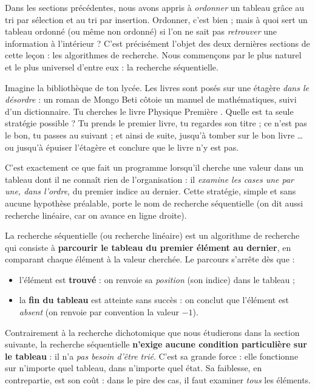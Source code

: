 \documentclass[11pt]{article}
\newcommand{\cle}[1]{{\popxbold\color{popdark}#1}}
\newcounter{popsec}
\newcounter{popsub}
\newcommand{\courssub}[1]{%
  \stepcounter{popsub}%
  \par\vspace{9pt}\noindent{\popxbold\fontsize{11.5}{13}\selectfont\color{popink}{\color{poporange}\thepopsec.\thepopsub}\hspace{6pt}#1}\par\nopagebreak\vspace{4pt}
}
\begin{document}
Dans les sections précédentes, nous avons appris à \emph{ordonner} un tableau grâce au tri par sélection et au tri par insertion. Ordonner, c'est bien ; mais à quoi sert un tableau ordonné (ou même non ordonné) si l'on ne sait pas \emph{retrouver} une information à l'intérieur ? C'est précisément l'objet des deux dernières sections de cette leçon : les \cle{algorithmes de recherche}. Nous commençons par le plus naturel et le plus universel d'entre eux : la \cle{recherche séquentielle}.

\courssub{Situation problème et intuition}

Imagine la bibliothèque de ton lycée. Les livres sont posés sur une étagère \emph{dans le désordre} : un roman de Mongo Beti côtoie un manuel de mathématiques, suivi d'un dictionnaire. Tu cherches le livre \og Physique Première \fg{}. Quelle est ta seule stratégie possible ? Tu prends le premier livre, tu regardes son titre ; ce n'est pas le bon, tu passes au suivant ; et ainsi de suite, jusqu'à tomber sur le bon livre \ldots{} ou jusqu'à épuiser l'étagère et conclure que le livre n'y est pas.

C'est exactement ce que fait un programme lorsqu'il cherche une valeur dans un tableau dont il ne connaît rien de l'organisation : il \emph{examine les cases une par une, dans l'ordre}, du premier indice au dernier. Cette stratégie, simple et sans aucune hypothèse préalable, porte le nom de \cle{recherche séquentielle} (on dit aussi \cle{recherche linéaire}, car on avance en ligne droite).

\begin{definition}
La \cle{recherche séquentielle} (ou recherche linéaire) est un algorithme de recherche qui consiste à \textbf{parcourir le tableau du premier élément au dernier}, en comparant chaque élément à la valeur cherchée. Le parcours s'arrête dès que :
\begin{itemize}
\item l'élément est \textbf{trouvé} : on renvoie sa \emph{position} (son indice) dans le tableau ;
\item la \textbf{fin du tableau} est atteinte sans succès : on conclut que l'élément est \emph{absent} (on renvoie par convention la valeur $-1$).
\end{itemize}
\end{definition}

\begin{propriete}
Contrairement à la recherche dichotomique que nous étudierons dans la section suivante, la recherche séquentielle \textbf{n'exige aucune condition particulière sur le tableau} : il n'a \emph{pas besoin d'être trié}. C'est sa grande force : elle fonctionne sur n'importe quel tableau, dans n'importe quel état. Sa faiblesse, en contrepartie, est son coût : dans le pire des cas, il faut examiner \emph{tous} les éléments.
\end{propriete}
\end{document}

